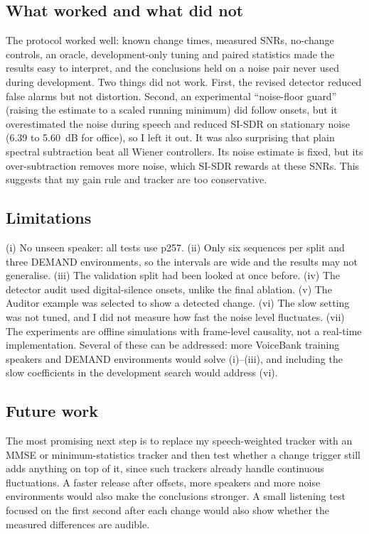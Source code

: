 \documentclass[10pt,conference,a4paper]{IEEEtran}
\begin{document}
\subsection{What worked and what did not}
The protocol worked well: known change times, measured SNRs, no-change controls,
an oracle, development-only tuning and paired statistics made the results easy to
interpret, and the conclusions held on a noise pair never used during
development. Two things did not work. First, the revised detector reduced false
alarms but not distortion. Second, an experimental ``noise-floor guard'' (raising the estimate to
a scaled running minimum) did follow onsets, but it overestimated the noise
during speech and reduced SI-SDR on stationary noise (6.39 to 5.60~dB for
office), so I left it out. It was also surprising that plain spectral
subtraction beat all Wiener controllers. Its noise estimate is fixed, but its
over-subtraction removes more noise, which SI-SDR rewards at these SNRs. This
suggests that my gain rule and tracker are too conservative.

\subsection{Limitations}
(i) No unseen speaker: all tests use p257. (ii) Only six sequences per split and
three DEMAND environments, so the intervals are wide and the results may not
generalise. (iii) The validation split had been looked at once before.
(iv) The detector audit used digital-silence onsets, unlike the final ablation.
(v) The Auditor example was selected to show a detected change. (vi) The slow
setting was not tuned, and I did not measure how fast the noise level
fluctuates. (vii) The experiments are offline simulations with frame-level
causality, not a real-time implementation. Several of these can be addressed:
more VoiceBank training speakers and DEMAND environments would solve
(i)--(iii), and including the slow coefficients in the development search would
address (vi).

\subsection{Future work}
\label{sec:future}
The most promising next step is to replace my speech-weighted tracker with an
MMSE or minimum-statistics tracker and then test whether a change trigger still
adds anything on top of it, since such trackers already handle continuous
fluctuations. A faster release after offsets, more speakers and more noise
environments would also make the conclusions stronger. A small listening test focused on the first second after each change
would also show whether the measured differences are audible.
\end{document}
